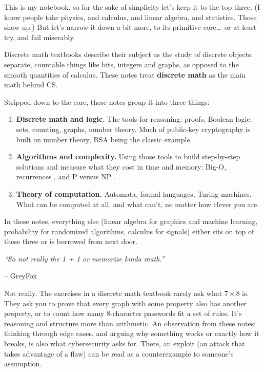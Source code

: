 \documentclass[11pt,a4paper]{article}
\renewenvironment{quote}
  {\list{}{\leftmargin=2.2em\rightmargin=2.2em\topsep=0.4em\parsep=0.3em}%
   \item\relax\itshape}
  {\endlist}
\newcommand{\attrib}[1]{\par\vspace{0.1em}\hspace*{2.2em}\normalfont #1\par}
\begin{document}
This is my notebook, so for the sake of simplicity let's keep it to the top three. (I know people
take physics, and calculus, and linear algebra, and statistics. Those show up.) But let's narrow
it down a bit more, to its primitive core\ldots\ or at least try, and fail miserably.

Discrete math textbooks describe their subject as the study of discrete objects: separate,
countable things like bits, integers and graphs, as opposed to the smooth quantities of calculus.
\cite{rosen} These notes treat \textbf{discrete math} as the main math behind CS.

Stripped down to the core, these notes group it into three things:

\begin{enumerate}
  \item \textbf{Discrete math and logic.} The tools for reasoning: proofs, Boolean logic, sets, counting,
        graphs, number theory. Much of public-key cryptography is built on number theory, RSA
        being the classic example. \cite{rsa}
  \item \textbf{Algorithms and complexity.} Using those tools to build step-by-step solutions and
        measure what they cost in time and memory: Big-O, recurrences \cite{knuth}, and P versus NP \cite{sipser}.
  \item \textbf{Theory of computation.} Automata, formal languages, Turing machines. What can be
        computed at all, and what can't, no matter how clever you are. \cite{turing} \cite{sipser}
\end{enumerate}

\newpage %
In these notes, everything else (linear algebra for graphics and machine learning, probability
for randomized algorithms, calculus for signals) either sits on top of these three or is borrowed
from next door.

\begin{quote}
``So not really the 1 + 1 or memorize kinda math.''
\end{quote}
\vspace{-0.6em}
\attrib{-- GreyFox}

Not really. The exercises in a discrete math textbook \cite{rosen} rarely ask what $7 \times 8$ is. They ask you
to prove that every graph with some property also has another property, or to count how many
8-character passwords fit a set of rules. It's reasoning and structure more than arithmetic. \cite{rosen}
An observation from these notes: thinking through edge cases, and arguing why something
works or exactly how it breaks, is also what cybersecurity asks for. There, an exploit (an attack
that takes advantage of a flaw) can be read as a counterexample to someone's assumption.
\end{document}
